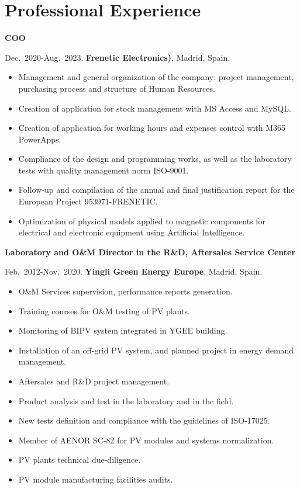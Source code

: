 \documentclass{article}
\begin{document}

\section*{Professional Experience}

{\bf COO}

\medskip
Dec.~2020-Aug.~2023.
{\bf Frenetic Electronics)},
Madrid, Spain.

\begin{itemize}\itemsep 0pt
	\item Management and general organization of the company: project management, purchasing process and structure of Human Resources.
	\item Creation of application for stock management with MS Access and MySQL.
	\item Creation of application for working hours and expenses control with M365 PowerApps.
	\item Compliance of the design and programming works, as well as the laboratory tests with quality management norm ISO-9001.
	\item Follow-up and compilation of the annual and final justification report for the European Project 953971-FRENETIC.
	\item Optimization of physical models applied to magnetic components for electrical and electronic equipment using Artificial Intelligence.
\end{itemize}

\newpage

{\bf Laboratory and O{\&}M Director in the R{\&}D, Aftersales Service Center}

\medskip
Feb.~2012-Nov.~2020.
{\bf Yingli Green Energy Europe},
Madrid, Spain.

\begin{itemize}\itemsep 0pt
\item O{\&}M Services supervision, performance reports generation.
\item Training courses for O{\&}M testing of PV plants.
\item Monitoring of BIPV system integrated in YGEE building.
\item Installation of an off-grid PV system, and planned project in energy demand management.
\item Aftersales and R{\&}D project management.
\item Product analysis and test in the laboratory and in the field.
\item New tests definition and compliance with the guidelines of ISO-17025.
\item Member of AENOR SC-82 for PV modules and systems normalization.
\item PV plants technical due-diligence.
\item PV module manufacturing facilities audits.
\end{itemize}
\end{document}
